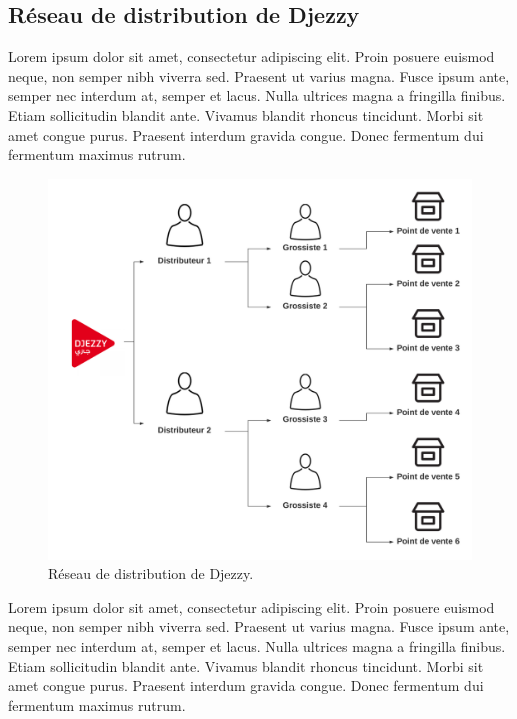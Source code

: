 \subsection{Réseau de distribution de Djezzy}

Lorem ipsum dolor sit amet, consectetur adipiscing elit. Proin posuere euismod neque, non semper nibh viverra sed. Praesent ut varius magna. Fusce ipsum ante, semper nec interdum at, semper et lacus. Nulla ultrices magna a fringilla finibus. Etiam sollicitudin blandit ante. Vivamus blandit rhoncus tincidunt. Morbi sit amet congue purus. Praesent interdum gravida congue. Donec fermentum dui fermentum maximus rutrum.

\medskip

\begin{figure}[hbt!]
  \centering
  \includegraphics[width=14cm]{images_pfe/reseau_distribution.png}
  \caption{Réseau de distribution de Djezzy.}
  \label{fig:reseau-distribution}
\end{figure}
\FloatBarrier

Lorem ipsum dolor sit amet, consectetur adipiscing elit. Proin posuere euismod neque, non semper nibh viverra sed. Praesent ut varius magna. Fusce ipsum ante, semper nec interdum at, semper et lacus. Nulla ultrices magna a fringilla finibus. Etiam sollicitudin blandit ante. Vivamus blandit rhoncus tincidunt. Morbi sit amet congue purus. Praesent interdum gravida congue. Donec fermentum dui fermentum maximus rutrum.

